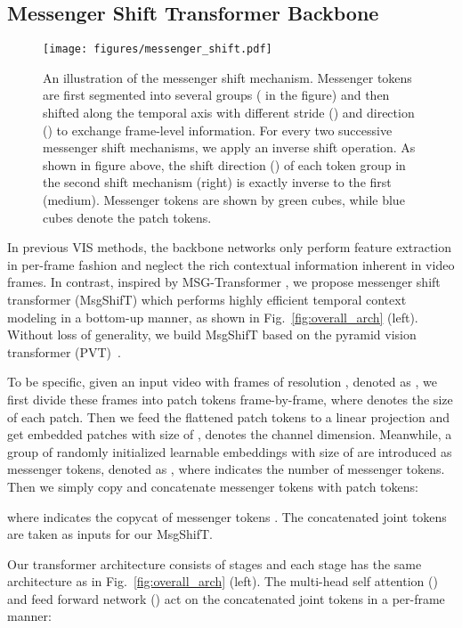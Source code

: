 \documentclass[10pt,twocolumn,letterpaper]{article}
\begin{document}
\subsection{Messenger Shift Transformer Backbone}
\label{sec:messenger_shift_transformer_backbone}

\begin{figure}
    \centering
    \texttt{[image: figures/messenger\_shift.pdf]}
    \caption{An illustration of the messenger shift mechanism. Messenger tokens are first segmented into several groups ( in the figure) and then shifted along the temporal axis with different stride () and direction () to exchange frame-level information. For every two successive messenger shift mechanisms, we apply an inverse shift operation. As shown in figure above, the shift direction () of each token group in the second shift mechanism (right) is exactly inverse to the first (medium). Messenger tokens are shown by green cubes, while blue cubes denote the patch tokens.}
    \label{fig:messenger_shift}
\end{figure}

In previous VIS methods, the backbone networks only perform feature extraction in per-frame fashion \cite{vistr, ifc} and neglect the rich contextual information inherent in video frames. In contrast, inspired by MSG-Transformer \cite{msgtransformer}, we propose messenger shift transformer (MsgShifT) which performs highly efficient temporal context modeling in a bottom-up manner, as shown in Fig.~\ref{fig:overall_arch} (left). Without loss of generality, we build MsgShifT based on the pyramid vision transformer (PVT)~\cite{pvt, pvtv2}.

To be specific, given an input video with  frames of resolution , denoted as , we first divide these frames into  patch tokens frame-by-frame, where  denotes the size of each patch. Then we feed the flattened patch tokens to a linear projection and get embedded patches  with size of ,  denotes the channel dimension.
Meanwhile, a group of randomly initialized learnable embeddings with size of  are introduced as messenger tokens, denoted as , where  indicates the number of messenger tokens.
Then we simply copy and concatenate messenger tokens with patch tokens:

where  indicates the copycat of messenger tokens . The concatenated joint tokens  are taken as inputs for our MsgShifT.

Our transformer architecture consists of  stages and each stage has the same architecture as in Fig.~\ref{fig:overall_arch} (left). The multi-head self attention () and feed forward network () act on the concatenated joint tokens in a per-frame manner:
\end{document}
